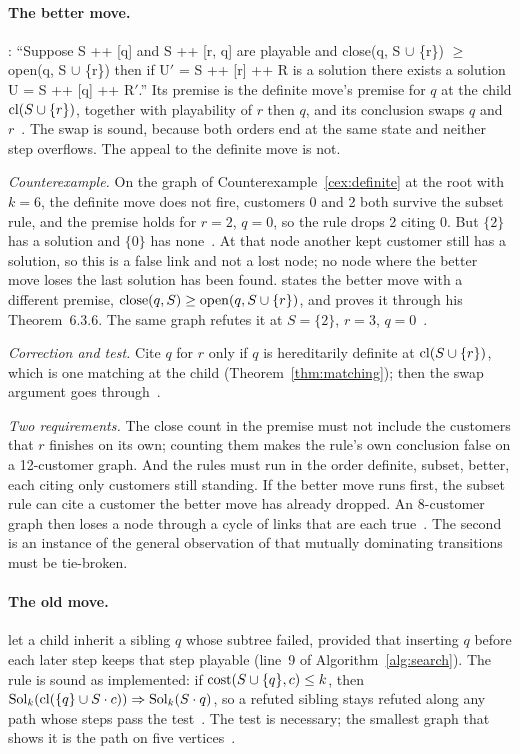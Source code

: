 \paragraph{The better move.} \citet[\S3.2, p.~6]{ChuStuckey2009}: ``Suppose
S ++ [q] and S ++ [r, q] are playable and close(q, S $\cup$ \{r\}) $\ge$
open(q, S $\cup$ \{r\}) then if U$'$ = S ++ [r] ++ R is a solution there exists a
solution U = S ++ [q] ++ R$'$.'' Its premise is the definite move's premise for
$q$ at the child $\mathrm{cl}(S\cup\{r\})$, together with playability of $r$ then $q$,
and its conclusion swaps $q$ and $r$~. The swap is sound,
because both orders end at the same state and neither step overflows. The
appeal to the definite move is not.

\emph{Counterexample.} On the graph of Counterexample~\ref{cex:definite} at the
root with $k=6$, the definite move does not fire, customers 0 and 2 both
survive the subset rule, and the premise holds for $r=2$, $q=0$, so the rule
drops 2 citing 0. But $\{2\}$ has a solution and $\{0\}$ has
none~. At that node another kept customer still has a
solution, so this is a false link and not a lost node; no node where the
better move loses the last solution has been found. \citet[Thm~6.3.8,
p.~143]{Chu2011} states the better move with a different premise,
$\mathrm{close}(q,S)\ge\mathrm{open}(q,S\cup\{r\})$, and proves it through his Theorem~6.3.6.
The same graph refutes it at $S=\{2\}$, $r=3$, $q=0$~.

\emph{Correction and test.} Cite $q$ for $r$ only if $q$ is hereditarily definite
at $\mathrm{cl}(S\cup\{r\})$, which is one matching at the child
(Theorem~\ref{thm:matching}); then the swap argument goes
through~.

\emph{Two requirements.} The close count in the premise must not include the
customers that $r$ finishes on its own; counting them makes the rule's own
conclusion false on a 12-customer graph. And the rules must run in the order
definite, subset, better, each citing only customers still standing. If the
better move runs first, the subset rule can cite a customer the better move
has already dropped. An 8-customer graph then loses a node through a cycle of
links that are each true~. The second is an instance of the
general observation of \citet[Prop.~3, Example~6]{Beck2025} that mutually
dominating transitions must be tie-broken.

\paragraph{The old move.} \citet[Thm~3, p.~7]{ChuStuckey2009} let a child
inherit a sibling $q$ whose subtree failed, provided that inserting $q$ before
each later step keeps that step playable (line~9 of
Algorithm~\ref{alg:search}). The rule is sound as implemented: if
$\mathrm{cost}(S\cup\{q\},c)\le k$, then
$\mathrm{Sol}_k(\mathrm{cl}(\{q\}\cup S\cdot c))\Rightarrow\mathrm{Sol}_k(S\cdot q)$, so a refuted
sibling stays refuted along any path whose steps pass the test~.
The test is necessary; the smallest graph that shows it is the path on five
vertices~.

